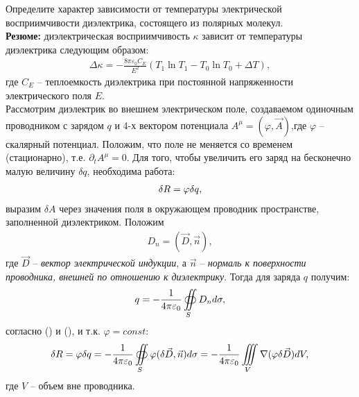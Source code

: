 \documentclass[__main__.tex]{subfiles}
\begin{document}
Определите характер зависимости от температуры электрической восприимчивости диэлектрика, состоящего из полярных молекул.\\ 

\textbf{Резюме:} диэлектрическая восприимчивость $\kappa$ зависит от температуры диэлектрика следующим образом:
\begin{gather}
	\Delta\kappa = -\frac{8\pi\varepsilon_0 C_E}{E^2}\left( T_1\ln T_1 - T_0\ln T_0 + \Delta T \right),
\end{gather}
где $C_E$ -- теплоемкость диэлектрика при постоянной напряженности электрического поля $E$.\\

Рассмотрим диэлектрик во внешнем электрическом поле, создаваемом одиночным проводником с зарядом $q$ и 4-х вектором потенциала $A^\mu=(\varphi,\vec{A})$,где $\varphi$ -- скалярный потенциал. Положим, что поле не меняется со временем (стационарно), т.е. $\partial_t A^\mu=0$. Для того, чтобы увеличить его заряд на бесконечно малую величину $\delta q$, необходима работа:
\begin{gather}
	\delta R = \varphi\delta q,\llabel{eq:work}
\end{gather}
выразим $\delta A$ через значения поля в окружающем проводник пространстве, заполненной диэлектриком. Положим
\begin{gather}
	D_n = (\vec{D},\vec{n}),
\end{gather}
где $\vec{D}$ -- \emph{вектор электрической индукции}, а $\vec{n}$ -- \emph{нормаль к поверхности проводника, внешней по отношению к диэлектрику}. Тогда для заряда $q$ получим:
\begin{gather}
	q = -\frac{1}{4\pi\varepsilon_0}\oiint\limits_{S}D_n d\sigma,\llabel{eq:q}
\end{gather}
согласно () и (), и т.к. $\varphi=const$:
\begin{gather}
	\delta R = \varphi\delta q =
	-\frac{1}{4\pi\varepsilon_0}\oiint\limits_{S}\varphi(\delta\vec{D},\vec{n})d\sigma =
	-\frac{1}{4\pi\varepsilon_0}\iiint\limits_{V}\nabla(\varphi\delta\vec{D})dV, \llabel{eq:workq}
\end{gather}
где $V$ -- объем вне проводника.
\end{document}
